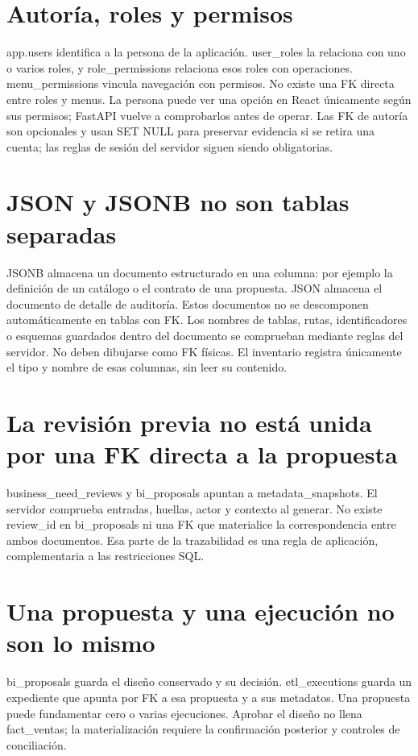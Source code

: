 \section{Autoría, roles y permisos}
app.users identifica a la persona de la aplicación. user\_\allowbreak{}roles la relaciona con uno o varios roles, y role\_\allowbreak{}permissions relaciona esos roles con operaciones. menu\_\allowbreak{}permissions vincula navegación con permisos. No existe una FK directa entre roles y menus. La persona puede ver una opción en React únicamente según sus permisos; FastAPI vuelve a comprobarlos antes de operar. Las FK de autoría son opcionales y usan SET NULL para preservar evidencia si se retira una cuenta; las reglas de sesión del servidor siguen siendo obligatorias.

\section{JSON y JSONB no son tablas separadas}
JSONB almacena un documento estructurado en una columna: por ejemplo la definición de un catálogo o el contrato de una propuesta. JSON almacena el documento de detalle de auditoría. Estos documentos no se descomponen automáticamente en tablas con FK. Los nombres de tablas, rutas, identificadores o esquemas guardados dentro del documento se comprueban mediante reglas del servidor. No deben dibujarse como FK físicas. El inventario registra únicamente el tipo y nombre de esas columnas, sin leer su contenido.

\section{La revisión previa no está unida por una FK directa a la propuesta}
business\_\allowbreak{}need\_\allowbreak{}reviews y bi\_\allowbreak{}proposals apuntan a metadata\_\allowbreak{}snapshots. El servidor comprueba entradas, huellas, actor y contexto al generar. No existe review\_\allowbreak{}id en bi\_\allowbreak{}proposals ni una FK que materialice la correspondencia entre ambos documentos. Esa parte de la trazabilidad es una regla de aplicación, complementaria a las restricciones SQL.

\section{Una propuesta y una ejecución no son lo mismo}
bi\_\allowbreak{}proposals guarda el diseño conservado y su decisión. etl\_\allowbreak{}executions guarda un expediente que apunta por FK a esa propuesta y a sus metadatos. Una propuesta puede fundamentar cero o varias ejecuciones. Aprobar el diseño no llena fact\_\allowbreak{}ventas; la materialización requiere la confirmación posterior y controles de conciliación.

